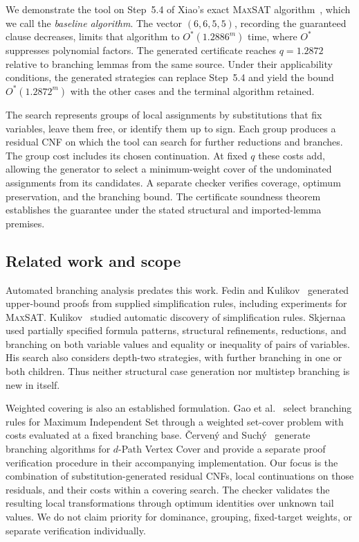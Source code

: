 \documentclass[10pt,twoside]{article}
\newcommand{\MaxSAT}{\textnormal{\textsc{MaxSAT}}}
\newcommand{\OhStar}{O^*}
\theoremstyle{definition}
\theoremstyle{remark}
\begin{document}
We demonstrate the tool on Step~5.4 of Xiao's exact \MaxSAT{}
algorithm~\cite{Xiao2022}, which we call the \emph{baseline algorithm}.
The vector $(6,6,5,5)$, recording the guaranteed clause decreases, limits
that algorithm to $\OhStar(1.2886^m)$ time, where $\OhStar$ suppresses
polynomial factors. The generated certificate reaches $q=1.2872$ relative
to branching lemmas from the same source. Under their applicability
conditions, the generated strategies can replace Step~5.4 and yield the
bound $\OhStar(1.2872^m)$ with the other cases and the terminal algorithm
retained.

The search represents groups of local assignments by substitutions that
fix variables, leave them free, or identify them up to sign. Each group
produces a residual CNF on which the tool can search for further
reductions and branches. The group cost includes its chosen continuation.
At fixed $q$ these costs add, allowing the generator to select a
minimum-weight cover of the undominated assignments from its candidates.
A separate checker verifies coverage, optimum preservation, and the
branching bound. The certificate soundness theorem establishes the
guarantee under the stated structural and imported-lemma premises.

\subsection{Related work and scope}
\label{sec:related}

Automated branching analysis predates this work. Fedin and
Kulikov~\cite{FedinKulikov2004,KulikovFedinPOMI2004} generated upper-bound proofs from supplied
simplification rules, including experiments for \MaxSAT{}.
Kulikov~\cite{Kulikov2005} studied automatic discovery of simplification
rules. Skjernaa~\cite[Chapter~8]{Skjernaa2004} used partially specified
formula patterns, structural refinements, reductions, and branching on both
variable values and equality or inequality of pairs of variables. His search
also considers depth-two strategies, with further branching in one or both
children. Thus neither structural case generation nor multistep branching is
new in itself.

Weighted covering is also an established formulation. Gao et
al.~\cite{GaoEtAl2024} select branching rules for Maximum Independent Set
through a weighted set-cover problem with costs evaluated at a fixed
branching base. \v{C}erven\'y and Such\'y~\cite{CervenySuchy2023} generate
branching algorithms for $d$-Path Vertex Cover and provide a separate proof
verification procedure in their accompanying implementation. Our focus is
the combination of substitution-generated residual CNFs, local continuations
on those residuals, and their costs within a covering search.
The checker validates the resulting local transformations through optimum
identities over unknown tail values. We do not claim priority for dominance,
grouping, fixed-target weights, or separate verification individually.
\end{document}
